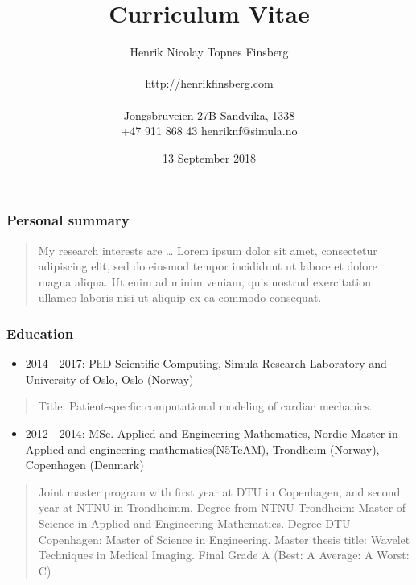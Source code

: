 \documentclass[11pt, a4paper]{article}
\title{Curriculum Vitae} %
\date{13 September 2018\\} %
\author{Henrik Nicolay Topnes Finsberg\\\\
  http://henrikfinsberg.com\\\\
Jongsbruveien 27B \textbar{} Sandvika, 1338\\ %
+47 911 868 43 \textbar{} henriknf@simula.no } %
\providecommand{\tightlist}{%
  \setlength{\itemsep}{0pt}\setlength{\parskip}{0pt}}
\begin{document}
\maketitle
\begin{raggedright}
\hypertarget{personal-summary}{%
\subsubsection{Personal summary}\label{personal-summary}}

\begin{quote}
My research interests are \ldots{} Lorem ipsum dolor sit amet,
consectetur adipiscing elit, sed do eiusmod tempor incididunt ut labore
et dolore magna aliqua. Ut enim ad minim veniam, quis nostrud
exercitation ullamco laboris nisi ut aliquip ex ea commodo consequat.
\end{quote}

\hypertarget{education}{%
\subsubsection{Education}\label{education}}

\begin{itemize}
\tightlist
\item
  2014 - 2017: PhD Scientific Computing, Simula Research Laboratory and
  University of Oslo, Oslo (Norway)
\end{itemize}

\begin{quote}
Title: Patient-specfic computational modeling of cardiac mechanics.
\end{quote}

\begin{itemize}
\tightlist
\item
  2012 - 2014: MSc. Applied and Engineering Mathematics, Nordic Master
  in Applied and engineering mathematics(N5TeAM), Trondheim (Norway),
  Copenhagen (Denmark)
\end{itemize}

\begin{quote}
Joint master program with first year at DTU in Copenhagen, and second
year at NTNU in Trondheimm. Degree from NTNU Trondheim: Master of
Science in Applied and Engineering Mathematics. Degree DTU Copenhagen:
Master of Science in Engineering. Master thesis title: Wavelet
Techniques in Medical Imaging. Final Grade A (Best: A Average: A Worst:
C)
\end{quote}


\end{raggedright}
\end{document}
